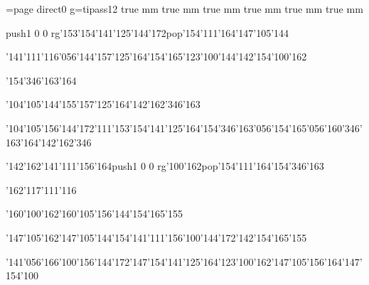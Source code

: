 \chardef\match=\pdfcolorstackinit page direct{0 g}\nopagenumbers\font\ipa=tipass12 true mm true mm true mm true mm true mm true mm
\null\vfill\ipa\centerline{\enskip\pdfcolorstack\match push{1 0 0 rg}\char'153\char'154\char'141\char'125\char'144\char'172\pdfcolorstack\match pop{}\enskip\enskip\enskip\enskip\char'154\char'111\char'164\enskip\enskip\enskip\enskip\enskip\enskip\enskip\enskip\enskip\enskip\char'147\char'105\char'144}\medskip\centerline{\enskip\char'141\char'111\char'116\char'056\char'144\char'157\char'125\char'164\enskip\char'154\char'165\enskip\char'123\char'100\char'144\enskip\enskip\enskip\enskip\enskip\char'142\char'154\char'100\char'162}\medskip\centerline{\enskip\enskip\enskip\enskip\enskip\enskip\enskip\enskip\char'154\char'346\char'163\char'164\enskip\enskip\enskip\enskip\enskip\enskip}\medskip\centerline{\enskip\enskip\enskip\enskip\enskip\enskip\enskip\enskip\char'104\char'105\char'144\enskip\char'155\char'157\char'125\char'164\enskip\enskip\enskip\enskip\enskip\char'142\char'162\char'346\char'163}\medskip\centerline{\enskip\enskip\char'104\char'105\char'156\char'144\char'172\enskip\char'111\enskip\char'153\char'154\char'141\char'125\char'164\enskip\char'154\char'346\char'163\char'056\char'154\char'165\char'056\char'160\char'346\char'163\char'164\enskip\char'142\char'162\char'346}\medskip\vfill\footline{\hfil\tt\folio\hfil}\eject
\null\vfill\ipa\centerline{\enskip\char'142\char'162\char'141\char'111\char'156\char'164\enskip\pdfcolorstack\match push{1 0 0 rg}\char'100\char'162\pdfcolorstack\match pop{}\enskip\char'154\char'111\char'164\enskip\enskip\enskip\enskip\enskip\enskip\enskip\enskip\enskip\enskip\char'154\char'346\char'163}\medskip\centerline{\enskip\enskip\enskip\enskip\char'162\char'117\char'111\char'116\enskip\enskip\enskip\enskip\enskip\enskip\enskip\enskip\enskip\enskip\enskip\enskip\enskip\enskip\enskip}\medskip\centerline{\enskip\char'160\char'100\char'162\enskip\enskip\enskip\enskip\char'160\char'105\char'156\char'144\enskip\enskip\enskip\char'154\char'165\char'155}\medskip\centerline{\enskip\enskip\enskip\enskip\char'147\char'105\char'162\enskip\char'147\char'105\char'144\enskip\char'154\char'141\char'111\char'156\enskip\char'100\char'144\char'172\enskip\char'142\char'154\char'165\char'155}\medskip\centerline{\enskip\char'141\char'056\char'166\char'100\char'156\char'144\char'172\enskip\enskip\enskip\char'147\char'154\char'141\char'125\char'164\enskip\char'123\char'100\char'162\enskip\enskip\enskip\char'147\char'105\char'156\char'164\enskip\char'147\char'154\char'100}\medskip\vfill\footline{\hfil\tt\folio\hfil}\eject
